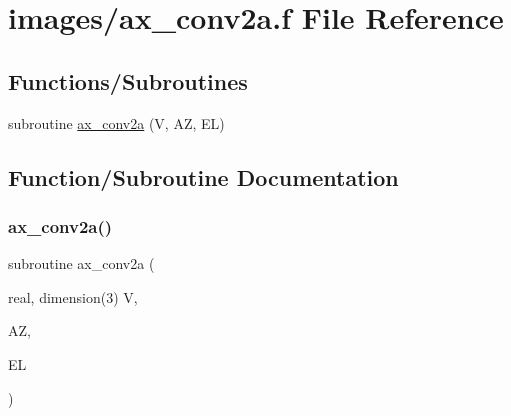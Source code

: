 \hypertarget{ax__conv2a_8f}{}\section{images/ax\+\_\+conv2a.f File Reference}
\label{ax__conv2a_8f}
\subsection*{Functions/\+Subroutines}
\begin{DoxyCompactItemize}
\item 
subroutine \hyperlink{ax__conv2a_8f_a056905b757688c9d144a2532855a71c7}{ax\+\_\+conv2a} (V, AZ, EL)
\end{DoxyCompactItemize}


\subsection{Function/\+Subroutine Documentation}
\mbox{\label{ax__conv2a_8f_a056905b757688c9d144a2532855a71c7}} 
\subsubsection{\texorpdfstring{ax\+\_\+conv2a()}{ax\_conv2a()}}
{\footnotesize\ttfamily subroutine ax\+\_\+conv2a (\begin{DoxyParamCaption}\item[{real, dimension(3)}]{V,  }\item[{}]{AZ,  }\item[{}]{EL }\end{DoxyParamCaption})}

